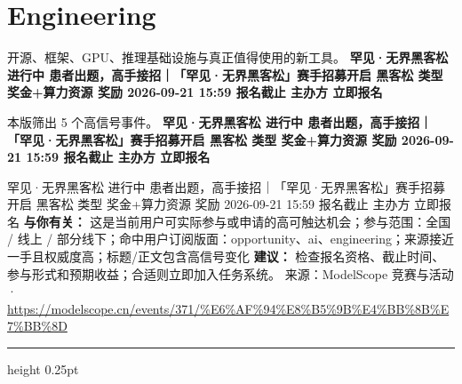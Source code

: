 \documentclass[10.5pt]{ctexart}
\begin{document}
\section*{Engineering}
{\color{ormuted} 开源、框架、GPU、推理基础设施与真正值得使用的新工具。}
\vspace{2mm}
{\LARGE\bfseries 罕见·无界黑客松 进行中 患者出题，高手接招｜「罕见·无界黑客松」赛手招募开启 黑客松 类型 奖金+算力资源 奖励 2026-09-21 15:59 报名截止 主办方 立即报名}\par
\vspace{1mm}
{\color{ormuted} 本版筛出 5 个高信号事件。}
\vspace{3mm}
{\Large\bfseries 罕见·无界黑客松 进行中 患者出题，高手接招｜「罕见·无界黑客松」赛手招募开启 黑客松 类型 奖金+算力资源 奖励 2026-09-21 15:59 报名截止 主办方 立即报名}\par
罕见·无界黑客松 进行中 患者出题，高手接招｜「罕见·无界黑客松」赛手招募开启 黑客松 类型 奖金+算力资源 奖励 2026-09-21 15:59 报名截止 主办方 立即报名
\textbf{与你有关：} 这是当前用户可实际参与或申请的高可触达机会；参与范围：全国 / 线上 / 部分线下；命中用户订阅版面：opportunity、ai、engineering；来源接近一手且权威度高；标题/正文包含高信号变化
\textbf{建议：} 检查报名资格、截止时间、参与形式和预期收益；合适则立即加入任务系统。
{\footnotesize\color{ormuted} 来源：ModelScope 竞赛与活动 · \url{https://modelscope.cn/events/371/%E6%AF%94%E8%B5%9B%E4%BB%8B%E7%BB%8D}}
\vspace{4mm}
\hrule height 0.25pt
\vspace{3mm}
\end{document}
